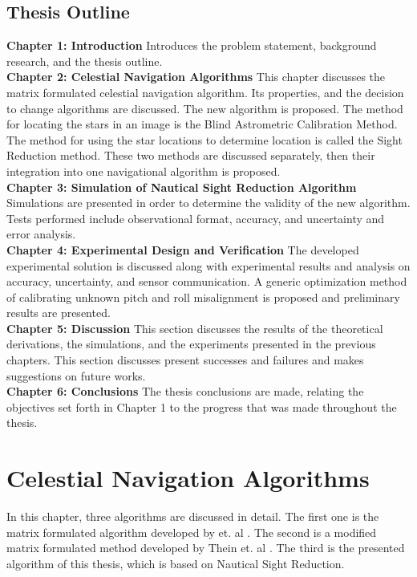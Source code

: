 \documentclass[12pt,a4paper]{book}
\begin{document}
\section{Thesis Outline}
\textbf{Chapter 1: Introduction} Introduces the problem statement, background research, and the thesis outline.
\\
\textbf{Chapter 2:  Celestial Navigation Algorithms}  This chapter discusses the matrix formulated celestial navigation algorithm.  Its properties, and the decision to change algorithms are discussed.  The new algorithm is proposed. The method for locating the stars in an image is the Blind Astrometric Calibration Method.  The method for using the star locations to determine location is called the Sight Reduction method.  These two methods are discussed separately, then their integration into one navigational algorithm is proposed.  
\\
\textbf{Chapter 3:  Simulation of Nautical Sight Reduction Algorithm}  Simulations are presented in order to determine the validity of the new algorithm.  Tests performed include observational format, accuracy, and uncertainty and error analysis.
\\
\textbf{Chapter 4:  Experimental Design and Verification}  The developed experimental solution is discussed along with experimental results and analysis on accuracy, uncertainty, and sensor communication.  A generic optimization method of calibrating unknown pitch and roll misalignment is proposed and preliminary results are presented.
\\
\textbf{Chapter 5: Discussion} This section discusses the results of the theoretical derivations, the simulations, and the experiments presented in the previous chapters.  This section discusses present successes and failures and makes suggestions on future works.
\\
\textbf{Chapter 6:  Conclusions}  The thesis conclusions are made, relating the objectives set forth in Chapter 1 to the progress that was made throughout the thesis.

\chapter{Celestial Navigation Algorithms}
In this chapter, three algorithms are discussed in detail.  The first one is the matrix formulated algorithm developed by  et. al \cite{b:gps}.  The second is a modified matrix formulated method developed by Thein et. al \cite{b:quinn}.  The third is the presented algorithm of this thesis, which is based on Nautical Sight Reduction.
\end{document}
